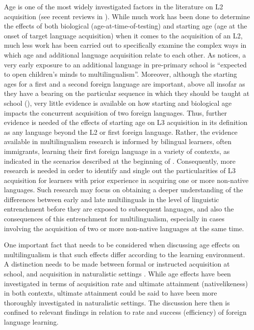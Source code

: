 \documentclass[output=paper]{../langscibook}
\begin{document}
Age is one of the most widely investigated factors in the literature on L2 acquisition (see recent reviews in \citealt{PfenningerSingleton2017, SingletonPfenninger2018, Muñoz2019, MuñozSingleton2019}). While much work has been done to determine the effects of both biological (age-at-time-of-testing) and starting age (age at the onset of target language acquisition) when it comes to the acquisition of an L2, much less work has been carried out to specifically examine the complex ways in which age and additional language acquisition relate to each other. As \citet[433]{Muñoz2019} notices, a very early exposure to an additional language in pre-primary school is “expected to open children’s minds to multilingualism”. Moreover, although the starting ages for a first and a second foreign language are important, above all insofar as they have a bearing on the particular sequence in which they should be taught at school (\citealt[222]{MuñozSingleton2019}), very little evidence is available on how starting and biological age impacts the concurrent acquisition of two foreign languages. Thus, further evidence is needed of the effects of starting age on L3 acquisition in its definition as any language beyond the L2 or first foreign language. Rather, the evidence available in multilingualism research is informed by bilingual learners, often immigrants, learning their first foreign language in a variety of contexts, as indicated in the scenarios described at the beginning of . Consequently, more research is needed in order to identify and single out the particularities of L3 acquisition for learners with prior experience in acquiring one or more non-native languages. Such research may focus on obtaining a deeper understanding of the differences between early and late multilinguals in the level of linguistic entrenchment before they are exposed to subsequent languages, and also the consequences of this entrenchment for multilingualism, especially in cases involving the acquisition of two or more non-native languages at the same time.

One important fact that needs to be considered when discussing age effects on multilingualism is that such effects differ according to the learning environment. A distinction needs to be made between formal or instructed acquisition at school, and acquisition in naturalistic settings \citep{Bardel2019}. While age effects have been investigated in terms of acquisition rate and ultimate attainment (nativelikeness) in both contexts, ultimate attainment could be said to have been more thoroughly investigated in naturalistic settings. The discussion here then is confined to relevant findings in relation to rate and success (efficiency) of foreign language learning.
\end{document}
